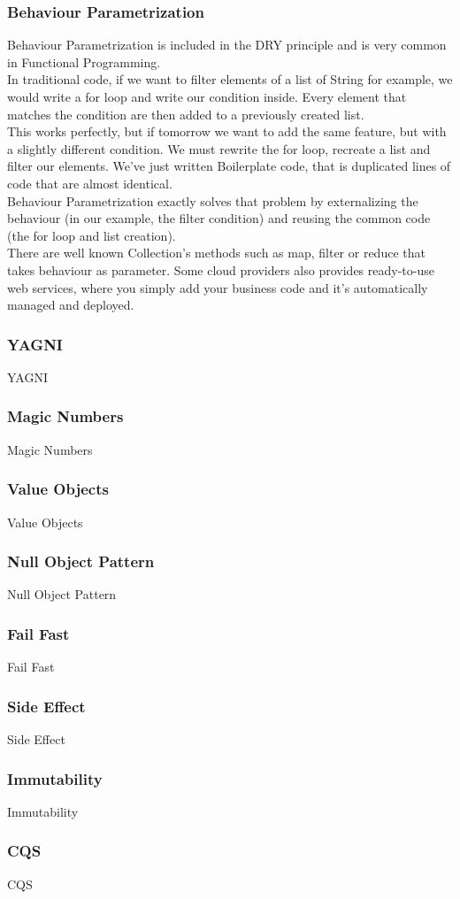 \subsubsection{Behaviour Parametrization}
Behaviour Parametrization is included in the DRY principle and is very
common in Functional Programming. \\
In traditional code, if we want to filter elements of a list of String
for example, we would write a for loop and write our condition inside.
Every element that matches the condition are then added to a previously
created list. \\
This works perfectly, but if tomorrow we want to add the same feature,
but with a slightly different condition.
We must rewrite the for loop, recreate a list and filter our elements.
We've just written Boilerplate code, that is duplicated lines of code
that are almost identical. \\
\newline
Behaviour Parametrization exactly solves that problem by externalizing
the behaviour (in our example, the filter condition) and reusing the
common code (the for loop and list creation). \\
There are well known Collection's methods such as map, filter or reduce
that takes behaviour as parameter.
Some cloud providers also provides ready-to-use web services,
where you simply add your business code and it's automatically managed
and deployed.

\subsubsection{YAGNI}
YAGNI

\subsubsection{Magic Numbers}
Magic Numbers

\subsubsection{Value Objects}
Value Objects

\subsubsection{Null Object Pattern}
Null Object Pattern

\subsubsection{Fail Fast}
Fail Fast

\subsubsection{Side Effect}
Side Effect

\subsubsection{Immutability}
Immutability

\subsubsection{CQS}
CQS
